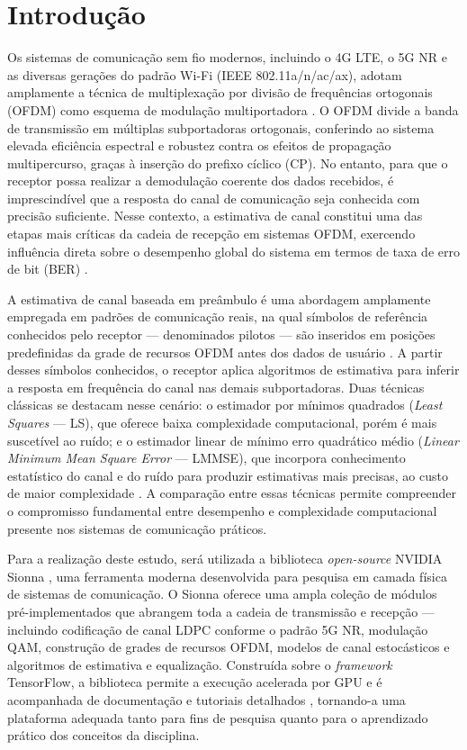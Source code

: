 \documentclass[conference]{IEEEtran}
\begin{document}
\section{Introdução}

Os sistemas de comunicação sem fio modernos, incluindo o 4G LTE, o 5G NR e as diversas gerações do padrão Wi-Fi (IEEE 802.11a/n/ac/ax), adotam amplamente a técnica de multiplexação por divisão de frequências ortogonais (OFDM) como esquema de modulação multiportadora \cite{goldsmith2005, proakis2008}. O OFDM divide a banda de transmissão em múltiplas subportadoras ortogonais, conferindo ao sistema elevada eficiência espectral e robustez contra os efeitos de propagação multipercurso, graças à inserção do prefixo cíclico (CP). No entanto, para que o receptor possa realizar a demodulação coerente dos dados recebidos, é imprescindível que a resposta do canal de comunicação seja conhecida com precisão suficiente. Nesse contexto, a estimativa de canal constitui uma das etapas mais críticas da cadeia de recepção em sistemas OFDM, exercendo influência direta sobre o desempenho global do sistema em termos de taxa de erro de bit (BER) \cite{3gpp38211}.

A estimativa de canal baseada em preâmbulo é uma abordagem amplamente empregada em padrões de comunicação reais, na qual símbolos de referência conhecidos pelo receptor — denominados pilotos — são inseridos em posições predefinidas da grade de recursos OFDM antes dos dados de usuário \cite{haykin2001}. A partir desses símbolos conhecidos, o receptor aplica algoritmos de estimativa para inferir a resposta em frequência do canal nas demais subportadoras. Duas técnicas clássicas se destacam nesse cenário: o estimador por mínimos quadrados (\textit{Least Squares} — LS), que oferece baixa complexidade computacional, porém é mais suscetível ao ruído; e o estimador linear de mínimo erro quadrático médio (\textit{Linear Minimum Mean Square Error} — LMMSE), que incorpora conhecimento estatístico do canal e do ruído para produzir estimativas mais precisas, ao custo de maior complexidade \cite{vanDeBeek1995}. A comparação entre essas técnicas permite compreender o compromisso fundamental entre desempenho e complexidade computacional presente nos sistemas de comunicação práticos.

Para a realização deste estudo, será utilizada a biblioteca \textit{open-source} NVIDIA Sionna \cite{hoydis2022}, uma ferramenta moderna desenvolvida para pesquisa em camada física de sistemas de comunicação. O Sionna oferece uma ampla coleção de módulos pré-implementados que abrangem toda a cadeia de transmissão e recepção — incluindo codificação de canal LDPC conforme o padrão 5G NR, modulação QAM, construção de grades de recursos OFDM, modelos de canal estocásticos e algoritmos de estimativa e equalização. Construída sobre o \textit{framework} TensorFlow, a biblioteca permite a execução acelerada por GPU e é acompanhada de documentação e tutoriais detalhados \cite{sionna_doc}, tornando-a uma plataforma adequada tanto para fins de pesquisa quanto para o aprendizado prático dos conceitos da disciplina.
\end{document}
